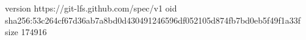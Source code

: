 version https://git-lfs.github.com/spec/v1
oid sha256:53c264cf67d36ab7a8bd0d430491246596df052105d874fb7bd0eb5f49f1a33f
size 174916
